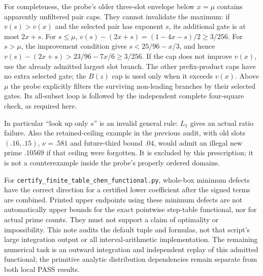 \documentclass[11pt]{article}
\begin{document}
For completeness, the probe's older three-slot envelope below $x=\mu$
contains apparently unfiltered pair caps. They cannot invalidate the
maximum: if $v(s)>v(x)$ and the selected pair has exponent $s$, its
additional gate is at most $2x+s$. For $s\le\mu$,
$v(s)-(2x+s)=(1-4x-s)/2\ge3/256$.
For $s>\mu$, the improvement condition gives
$s<25/96-x/3$, and hence
$v(s)-(2x+s)>23/96-7x/6\ge3/256$.
If the cap does not improve $v(x)$, use the already admitted largest
slot branch. The other prefix-product caps have no extra selected
gate; the $B(z)$ cap is used only when it exceeds $v(x)$.
Above $\mu$ the probe explicitly filters the surviving non-leading
branches by their selected gates. Its all-subset loop is followed by
the independent complete four-square check, as required here.

In particular ``look up only $s$'' is an invalid general rule:
$L_1$ gives an actual ratio failure. Also the retained-ceiling example
in the previous audit, with old slots $(.16,.15)$, $\nu=.581$ and
future-third bound $.04$, would admit an illegal new prime $.10569$
if that ceiling were forgotten. It is excluded by this prescription;
it is not a counterexample inside the probe's properly ordered domains.

For \texttt{certify\_finite\_table\_chen\_functional.py}, whole-box
minimum defects have the correct direction for a certified lower
coefficient after the signed terms are combined. Printed upper
endpoints using these minimum defects are not automatically upper
bounds for the exact pointwise step-table functional, nor for actual
prime counts. They must not support a claim of optimality or impossibility.
This note audits the default tuple and formulas, not that script's
large integration output or all interval-arithmetic implementation.
The remaining numerical task is an outward integration and independent
replay of this admitted functional; the primitive analytic distribution
dependencies remain separate from both local PASS results.
\end{document}
